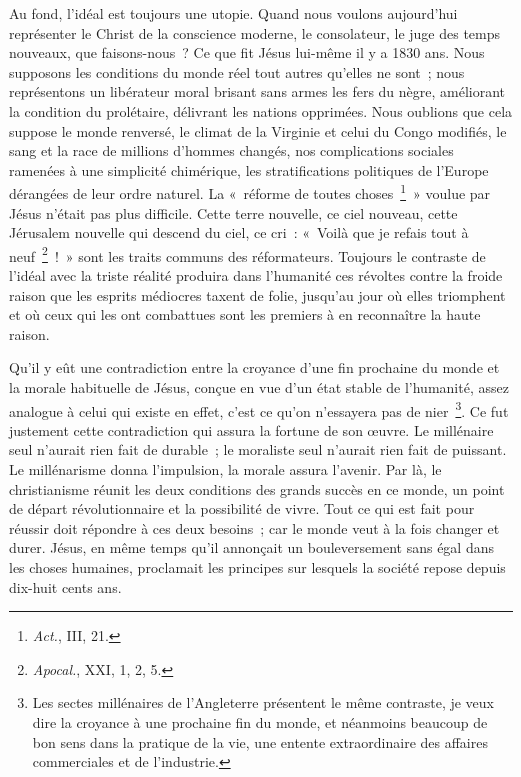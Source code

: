 \documentclass[french,twoside]{book} %
\begin{document}
Au fond, l’idéal est toujours une utopie. Quand nous voulons aujourd’hui représenter le Christ de la conscience moderne, le consolateur, le juge des temps nouveaux, que faisons-nous ? Ce que fit Jésus lui-même il y a 1830 ans. Nous supposons les conditions du monde réel tout autres qu’elles ne sont ; nous représentons un libérateur moral brisant sans armes les fers du nègre, améliorant la condition du prolétaire, délivrant les nations opprimées. Nous oublions que cela suppose le monde renversé, le climat de la Virginie et celui du Congo modifiés, le sang et la race de millions d’hommes changés, nos complications sociales ramenées à une simplicité chimérique, les stratifications politiques de l’Europe dérangées de leur ordre naturel. La « réforme de toutes choses \footnote{{\itshape Act.}, III, 21.} » voulue par Jésus n’était pas plus difficile. Cette terre nouvelle, ce ciel nouveau, cette Jérusalem nouvelle qui descend du ciel, ce cri : « Voilà que je refais tout à neuf \footnote{{\itshape Apocal.}, XXI, 1, 2, 5.} ! » sont les traits communs des réformateurs. Toujours le contraste de l’idéal avec la triste réalité produira dans l’humanité ces révoltes contre la froide raison que les esprits médiocres taxent de folie, jusqu’au jour où elles triomphent et où ceux qui les ont combattues sont les premiers à en reconnaître la haute raison.\par
Qu’il y eût une contradiction entre la croyance d’une fin prochaine du monde et la morale habituelle de Jésus, conçue en vue d’un état stable de l’humanité, assez analogue à celui qui existe en effet, c’est ce qu’on n’essayera pas de nier \footnote{Les sectes millénaires de l’Angleterre présentent le même contraste, je veux dire la croyance à une prochaine fin du monde, et néanmoins beaucoup de bon sens dans la pratique de la vie, une entente extraordinaire des affaires commerciales et de l’industrie.}. Ce fut justement cette contradiction qui assura la fortune de son œuvre. Le millénaire seul n’aurait rien fait de durable ; le moraliste seul n’aurait rien fait de puissant. Le millénarisme donna l’impulsion, la morale assura l’avenir. Par là, le christianisme réunit les deux conditions des grands succès en ce monde, un point de départ révolutionnaire et la possibilité de vivre. Tout ce qui est fait pour réussir doit répondre à ces deux besoins ; car le monde veut à la fois changer et durer. Jésus, en même temps qu’il annonçait un bouleversement sans égal dans les choses humaines, proclamait les principes sur lesquels la société repose depuis dix-huit cents ans.\par
\end{document}
